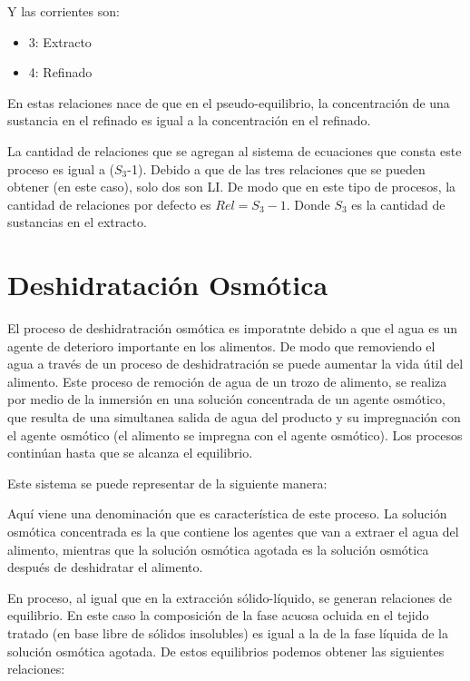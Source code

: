 Y las corrientes son:
\begin{itemize}
    \item 3: Extracto
    \item 4: Refinado
\end{itemize}

En estas relaciones nace de que en el pseudo-equilibrio, la concentración de una sustancia en el refinado es igual a la concentración en el refinado. 

La cantidad de relaciones que se agregan al sistema de ecuaciones que consta este proceso es igual a ($S_3$-1). Debido a que de las tres relaciones que se pueden obtener (en este caso), solo dos son LI.
De modo que en este tipo de procesos, la cantidad de relaciones por defecto es $Rel=S_3-1$. Donde $S_3$ es la cantidad de sustancias en el extracto.

\clearpage
\section{Deshidratación Osmótica}

El proceso de deshidratración osmótica es imporatnte debido a que el agua es un agente de deterioro importante en los alimentos. De modo que removiendo el agua a través de un proceso de deshidratración se puede aumentar la vida útil del alimento.
Este proceso de remoción de agua de un trozo de alimento, se realiza por medio de la inmersión en una solución concentrada de un agente osmótico, que resulta de una simultanea salida de agua del producto y su impregnación con el agente osmótico (el alimento se impregna con el agente osmótico).
Los procesos continúan hasta que se alcanza el equilibrio.

Este sistema se puede representar de la siguiente manera:

Aquí viene una denominación que es característica de este proceso. La solución osmótica concentrada es la que contiene los agentes que van a extraer el agua del alimento, mientras que la solución osmótica agotada es la solución osmótica después de deshidratar el alimento.

En proceso, al igual que en la extracción sólido-líquido, se generan relaciones de equilibrio. En este caso la composición de la fase acuosa ocluida en el tejido tratado (en base libre de sólidos insolubles) es igual a la de la fase líquida de la solución osmótica agotada.
De estos equilibrios podemos obtener las siguientes relaciones:

